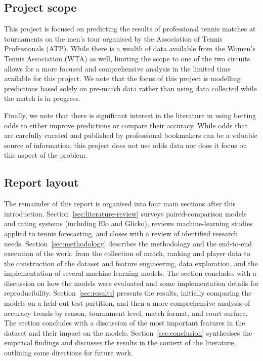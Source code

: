 \subsection{Project scope}

This project is focused on predicting the results of professional tennis matches at tournaments on
the men's tour organised by the Association of Tennis Professionals (ATP). While there
is a wealth of data available from the Women's Tennis Association (WTA) as well, limiting the scope
to one of the two circuits allows for a more focused and comprehensive analysis in the limited time
available for this project. We note that the focus of this project is modelling predictions based
solely on pre-match data rather than using data collected while the match is in progress.

Finally, we note that there is significant interest in the literature in using betting odds to
either improve predictions or compare their accuracy. While odds that are carefully curated and
published by professional bookmakers can be a valuable source of information, this project does not
use odds data
nor does it focus on this aspect of the problem.


\subsection{Report layout}

The remainder of this report is organised into four main sections after this introduction.
Section~\ref{sec:literature-review} surveys paired-comparison models and rating systems (including
Elo and Glicko), reviews machine-learning studies applied to tennis forecasting, and closes with a
review of identified research needs. Section~\ref{sec:methodology} describes the methodology and
the end-to-end execution of the work: from the collection of match, ranking and player data to the
construction of the dataset and feature engineering, data exploration, and the implementation of
several machine learning models. The section concludes with a discussion on how the models were
evaluated and some implementation details for reproducibility. Section~\ref{sec:results} presents
the results, initially comparing the models on a held-out test partition, and then a more
comprehensive analysis of accuracy trends by season, tournament level, match format, and court
surface. The section concludes with a discussion of the most important features in the dataset and
their impact on
the models. Section~\ref{sec:conclusion} synthesises the empirical findings and discusses the
results in the context of the literature, outlining some directions for future work.


